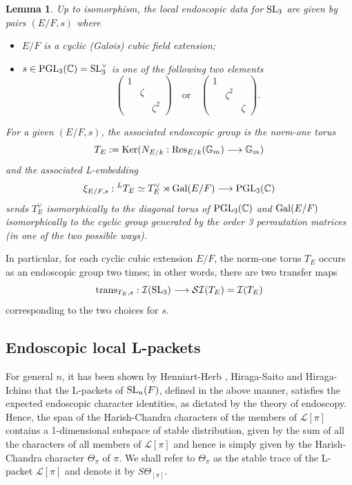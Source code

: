 \documentclass[11pt]{amsart}
\theoremstyle{plain}
\newtheorem{lemma}[equation]{Lemma}
\numberwithin{equation}{section}
\newcommand{\C}{\mathbb C}
\def\SL{{\rm SL}}
\def\PGL{{\rm PGL}}
\def\C{{\bf C}}
\def\C{{\mathbb C}}
\begin{document}
\begin{lemma}
Up to isomorphism, the local endoscopic data for $\SL_3$  are given by pairs $(E/F, s)$ where
\begin{itemize}
\item $E/F$ is a cyclic (Galois) cubic field extension;
\item $s \in \PGL_3(\C) = \SL_3^{\vee}$ is one of the following two elements
\begin{equation} \label{E:s}
   \left( \begin{array}{ccc}
1 & & \\
& \zeta & \\
& & \zeta^2 \end{array} \right) \quad \text{or} \quad 
 \left( \begin{array}{ccc}
1 & & \\
& \zeta^2 & \\
& & \zeta \end{array} \right).  \end{equation}
\end{itemize}
For a given $(E/F, s)$, the associated endoscopic group is the norm-one torus
\[ T_E := {\rm Ker}( N_{E/k}: {\rm Res}_{E/k}(\mathbb{G}_m)\longrightarrow \mathbb{G}_m) \]
and the associated L-embedding
\[  \xi_{E/F,s}: {^L}T_E\simeq  T_E^{\vee} \rtimes {\rm Gal}(E/F)  \longrightarrow \PGL_3(\C) \]
 sends $T_E^{\vee}$ isomorphically to the diagonal torus of $\PGL_3(\C)$ and ${\rm Gal}(E/F)$ isomorphically to the cyclic group generated by the order 3 permutation matrices (in one of the two possible ways).  

 \end{lemma}
In particular, for each cyclic cubic extension $E/F$, the norm-one torus $T_E$ occurs as an endoscopic group two times; in other words, there are two transfer maps 
\[  {\rm trans}_{T_E, s}: \mathcal{I}(\SL_3) \longrightarrow \mathcal{SI}(T_E) = \mathcal{I}(T_E) \]
corresponding to the two choices for $s$.  
\vskip 5pt

 
\vskip 5pt

\subsection{\bf Endoscopic local L-packets} \label{SS:endoL}
For general $n$,  it has been shown by Henniart-Herb \cite{HH}, Hiraga-Saito \cite{HiS1, HiS2} and Hiraga-Ichino \cite{HI}  that 
the L-packets of $\SL_n(F)$, defined in the above manner, satisfies the expected endoscopic character identities, as dictated by the theory of endoscopy. 
Hence, the span of the Harish-Chandra characters of the members of $\mathcal{L}[\pi]$ 
contains a 1-dimensional subspace of stable distribution, given by  the  sum of  all the characters of all members of  $\mathcal{L}[\pi]$ and hence is simply given by the Harish-Chandra character $\Theta_{\pi}$ of $\pi$. We shall refer to $\Theta_{\pi}$ as 
the stable trace of the L-packet $\mathcal{L}[\pi]$ and denote it by $S\Theta_{[\pi]}$.
\vskip 5pt
\end{document}
